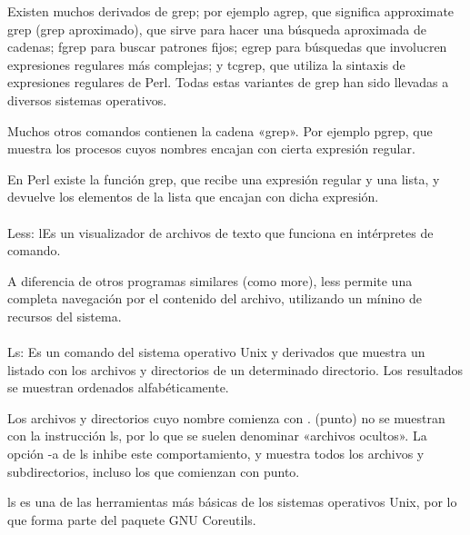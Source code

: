 \documentclass{article}
\begin{document}
Existen muchos derivados de grep; por ejemplo agrep, que significa approximate grep (grep aproximado), que sirve para hacer una búsqueda aproximada de cadenas; fgrep para buscar patrones fijos; egrep para búsquedas que involucren expresiones regulares más complejas; y tcgrep, que utiliza la sintaxis de expresiones regulares de Perl. Todas estas variantes de grep han sido llevadas a diversos sistemas operativos.

Muchos otros comandos contienen la cadena «grep». Por ejemplo pgrep, que muestra los procesos cuyos nombres encajan con cierta expresión regular.

En Perl existe la función grep, que recibe una expresión regular y una lista, y devuelve los elementos de la lista que encajan con dicha expresión.
\\
\\
Less: lEs un visualizador de archivos de texto que funciona en intérpretes de comando.

A diferencia de otros programas similares (como more), less permite una completa navegación por el contenido del archivo, utilizando un mínino de recursos del sistema.
\\
\\
Ls: Es un comando del sistema operativo Unix y derivados que muestra un listado con los archivos y directorios de un determinado directorio. Los resultados se muestran ordenados alfabéticamente.

Los archivos y directorios cuyo nombre comienza con . (punto) no se muestran con la instrucción ls, por lo que se suelen denominar «archivos ocultos». La opción -a de ls inhibe este comportamiento, y muestra todos los archivos y subdirectorios, incluso los que comienzan con punto.

ls es una de las herramientas más básicas de los sistemas operativos Unix, por lo que forma parte del paquete GNU Coreutils.
\end{document}
